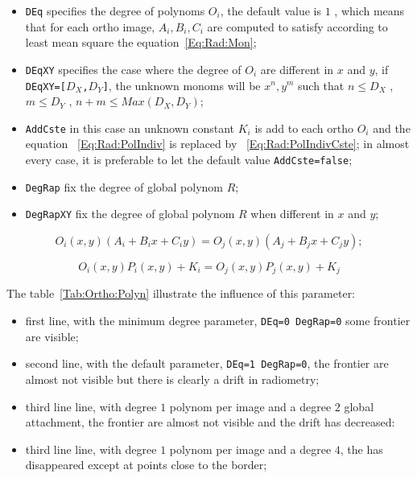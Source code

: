 \begin{itemize}
  \item {\tt DEq} specifies the degree of polynoms $O_i$, the default value is
        $1$ , which means that for each ortho image, $A_i,B_i,C_i$ are computed
        to satisfy according to least mean square the equation~\ref{Eq:Rad:Mon};

   \item {\tt DEqXY} specifies the case where the degree of $O_i$ are different in
         $x$ and $y$, if  {\tt DEqXY=[$D_X$,$D_Y$]}, the unknown monoms will
         be $x^n,y^m$ such that $n\leq D_X$ , $m\leq D_Y$ ,   $n+m\leq Max(D_X,D_Y)$;

   \item {\tt AddCste} in this case an unknown constant $K_i$ is add to each ortho $O_i$ and
          the equation ~\ref{Eq:Rad:PolIndiv} is replaced by ~\ref{Eq:Rad:PolIndivCste};
          in almost every case, it is preferable to let the default value {\tt AddCste=false};

   \item {\tt DegRap} fix the degree of global polynom $R$;

   \item {\tt DegRapXY} fix the degree of global polynom $R$ when different in $x$ and $y$;

\end{itemize}



\begin{equation}
O_i(x,y)(A_i+B_ix+C_iy)=O_j(x,y)(A_j+B_jx+C_jy);
\label{Eq:Rad:Mon}
\end{equation}

\begin{equation}
   O_i(x,y) P_i(x,y) + K_i = O_j(x,y) P_j(x,y) + K_j
\label{Eq:Rad:PolIndivCste}
\end{equation}

The table~\ref{Tab:Ortho:Polyn} illustrate the influence of this parameter:

\begin{itemize}
   \item first line, with the minimum degree parameter, {\tt DEq=0 DegRap=0} some
         frontier are visible;
   \item second line, with the default parameter, {\tt DEq=1 DegRap=0}, the frontier
         are almost not visible but there is clearly a drift in radiometry;
   \item third line line, with  degree $1$ polynom per image and a degree $2$ global
         attachment, the frontier are almost not visible and the drift has decreased:
   \item third line line, with  degree $1$ polynom per image and a degree $4$, the
         has disappeared except at points close to the border;
\end{itemize}

